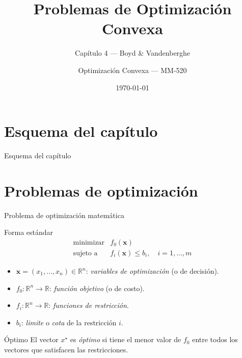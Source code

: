 \documentclass[10pt,aspectratio=169]{beamer}
\title{Problemas de Optimización Convexa}
\subtitle{Capítulo 4 --- Boyd \& Vandenberghe}
\author{Optimización Convexa --- MM-520}
\date{\today}
\newcommand{\R}{\mathbb{R}}
\newcommand{\x}{\mathbf{x}}
\newcommand{\0}{\mathbf{0}}
\begin{document}
\begin{frame}
  \titlepage
\end{frame}

\section{Esquema del capítulo}
\begin{frame}{Esquema del capítulo}
  \tableofcontents
\end{frame}

\section{Problemas de optimización}
\begin{frame}{Problema de optimización matemática}
  \begin{block}{Forma estándar}
    \[
      \begin{array}{ll}
        \text{minimizar} & f_0(\x) \\
        \text{sujeto a}  & f_i(\x) \le b_i, \quad i=1,\dots,m
      \end{array}
    \]
  \end{block}
  \begin{itemize}
    \item $\x=(x_1,\dots,x_n)\in\R^n$: \emph{variables de optimización} (o de decisión).
    \item $f_0:\R^n\to\R$: \emph{función objetivo} (o de costo).
    \item $f_i:\R^n\to\R$: \emph{funciones de restricción}.
    \item $b_i$: \emph{limite} o \emph{cota} de la restricción $i$.
  \end{itemize}
  \vspace{0.3em}
  \begin{alertblock}{Óptimo}
    El vector $x^\star$ es \emph{óptimo} si tiene el menor valor de $f_0$ entre todos los
    vectores que satisfacen las restricciones.
  \end{alertblock}
\end{frame}
\end{document}
